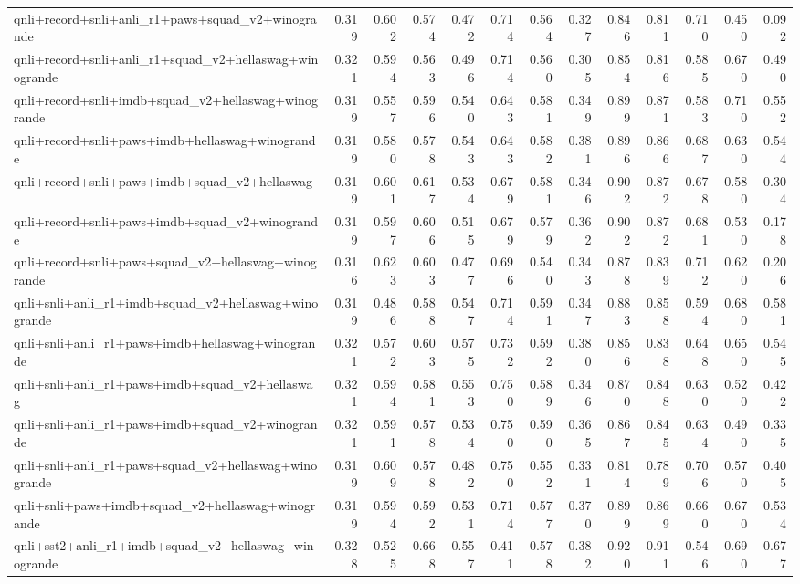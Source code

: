 \begin{table}[t]
\begin{tabular}{lrrrrrrrrrrrr}
    qnli+record+snli+anli\_r1+paws+squad\_v2+winogrande & 0.319 & 0.602 & 0.574 & 0.472 & 0.714 & 0.564 & 0.327 & 0.846 & 0.811 & 0.710 & 0.450 & 0.092 \\
    qnli+record+snli+anli\_r1+squad\_v2+hellaswag+winogrande & 0.321 & 0.594 & 0.563 & 0.496 & 0.714 & 0.560 & 0.305 & 0.854 & 0.816 & 0.585 & 0.670 & 0.490 \\
    qnli+record+snli+imdb+squad\_v2+hellaswag+winogrande & 0.319 & 0.557 & 0.596 & 0.540 & 0.643 & 0.581 & 0.349 & 0.899 & 0.871 & 0.583 & 0.710 & 0.552 \\
    qnli+record+snli+paws+imdb+hellaswag+winogrande & 0.319 & 0.580 & 0.578 & 0.543 & 0.643 & 0.582 & 0.381 & 0.896 & 0.866 & 0.687 & 0.630 & 0.544 \\
    qnli+record+snli+paws+imdb+squad\_v2+hellaswag & 0.319 & 0.601 & 0.617 & 0.534 & 0.679 & 0.581 & 0.346 & 0.902 & 0.872 & 0.678 & 0.580 & 0.304 \\
    qnli+record+snli+paws+imdb+squad\_v2+winogrande & 0.319 & 0.597 & 0.606 & 0.515 & 0.679 & 0.579 & 0.362 & 0.902 & 0.872 & 0.681 & 0.530 & 0.178 \\
    qnli+record+snli+paws+squad\_v2+hellaswag+winogrande & 0.316 & 0.623 & 0.603 & 0.477 & 0.696 & 0.540 & 0.343 & 0.878 & 0.839 & 0.712 & 0.620 & 0.206 \\
    qnli+snli+anli\_r1+imdb+squad\_v2+hellaswag+winogrande & 0.319 & 0.486 & 0.588 & 0.547 & 0.714 & 0.591 & 0.347 & 0.883 & 0.858 & 0.594 & 0.680 & 0.581 \\
    qnli+snli+anli\_r1+paws+imdb+hellaswag+winogrande & 0.321 & 0.572 & 0.603 & 0.575 & 0.732 & 0.592 & 0.380 & 0.856 & 0.838 & 0.648 & 0.650 & 0.545 \\
    qnli+snli+anli\_r1+paws+imdb+squad\_v2+hellaswag & 0.321 & 0.594 & 0.581 & 0.553 & 0.750 & 0.589 & 0.346 & 0.870 & 0.848 & 0.630 & 0.520 & 0.422 \\
    qnli+snli+anli\_r1+paws+imdb+squad\_v2+winogrande & 0.321 & 0.591 & 0.578 & 0.534 & 0.750 & 0.590 & 0.365 & 0.867 & 0.845 & 0.634 & 0.490 & 0.335 \\
    qnli+snli+anli\_r1+paws+squad\_v2+hellaswag+winogrande & 0.319 & 0.609 & 0.578 & 0.482 & 0.750 & 0.552 & 0.331 & 0.814 & 0.789 & 0.706 & 0.570 & 0.405 \\
    qnli+snli+paws+imdb+squad\_v2+hellaswag+winogrande & 0.319 & 0.594 & 0.592 & 0.531 & 0.714 & 0.577 & 0.370 & 0.899 & 0.869 & 0.660 & 0.670 & 0.534 \\
    qnli+sst2+anli\_r1+imdb+squad\_v2+hellaswag+winogrande & 0.328 & 0.525 & 0.668 & 0.557 & 0.411 & 0.578 & 0.382 & 0.920 & 0.911 & 0.546 & 0.690 & 0.677 \\

\end{tabular}
\end{table}
